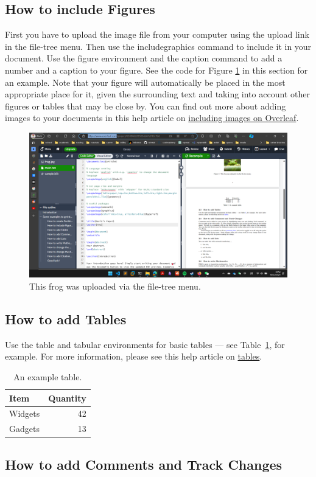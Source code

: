 \documentclass{article}
\begin{document}
\subsection{How to include Figures}
First you have to upload the image file from your computer using the upload link in the file-tree menu. Then use the includegraphics command to include it in your document. Use the figure environment and the caption command to add a number and a caption to your figure. See the code for Figure \ref{fig:frog} in this section for an example.
Note that your figure will automatically be placed in the most appropriate place for it, given the surrounding text and taking into account other figures or tables that may be close by. You can find out more about adding images to your documents in this help article on \href{https://www.overleaf.com/learn/how-to/Including_images_on_Overleaf}{including images on Overleaf}.

\begin{figure}[h]
\centering
\includegraphics[width=0.25\linewidth]{test1.png}
\caption{\label{fig:frog}This frog was uploaded via the file-tree menu.}
\end{figure}

\subsection{How to add Tables}


Use the table and tabular environments for basic tables --- see Table~\ref{tab:widgets}, for example. For more information, please see this help article on \href{https://www.overleaf.com/learn/latex/tables}{tables}.

\begin{table}[h]
\centering
\begin{tabular}{l|r}
Item & Quantity \\\hline
Widgets & 42 \\
Gadgets & 13
\end{tabular}
\caption{\label{tab:widgets}An example table.}
\end{table}

\subsection{How to add Comments and Track Changes}
\end{document}
